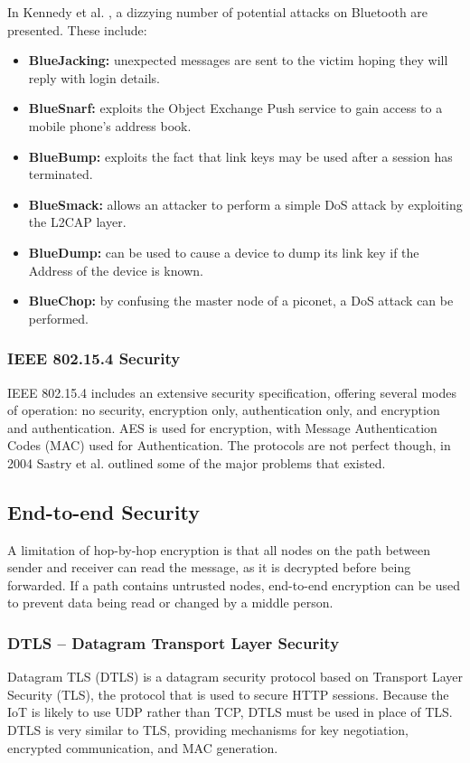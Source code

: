 \documentclass[10pt,journal,compsoc]{IEEEtran}
\begin{document}
In Kennedy et al. \cite{Kennedy2008}, a dizzying number of potential attacks on
Bluetooth are presented. These include: 
\begin{itemize}[$\bullet$]
\item {\bf BlueJacking:} unexpected messages are sent to the victim hoping they
will reply with login details. 
\item {\bf BlueSnarf:} exploits the Object Exchange Push service to gain
access to a mobile phone's address book. 
\item {\bf BlueBump:} exploits the fact that link keys may be used after a session
has terminated. 
\item {\bf BlueSmack:} allows an attacker to perform a simple DoS attack by
exploiting the L2CAP layer.
\item {\bf BlueDump:} can be used to cause a device to dump its link key if the
 Address of the device is known. 
\item {\bf BlueChop:} by confusing the master node of a piconet, a DoS attack can be
performed. 
\end{itemize}

\subsubsection{IEEE 802.15.4 Security}
IEEE 802.15.4 includes an extensive security specification, offering several
modes of operation: no security, encryption only, authentication only, and
encryption and authentication. AES is used for encryption, with Message
Authentication Codes (MAC) used for Authentication. The protocols are not
perfect though, in 2004 Sastry et al.  \cite{Sastry2004} outlined some of the
major problems that existed.  


\subsection{End-to-end Security}
A limitation of hop-by-hop encryption is that all nodes on the path between
sender and receiver can read the message, as it is decrypted before being
forwarded. If a path contains untrusted nodes, end-to-end encryption can be
used to prevent data being read or changed by a middle person. 

\subsubsection{DTLS -- Datagram Transport Layer Security}
Datagram TLS (DTLS) is a datagram security protocol based on Transport Layer
Security (TLS), the protocol that is used to secure HTTP sessions. Because the
IoT is likely to use UDP rather than TCP, DTLS must be used in place of TLS.
DTLS is very similar to TLS, providing mechanisms for key negotiation,
encrypted communication, and MAC generation.  
\end{document}
